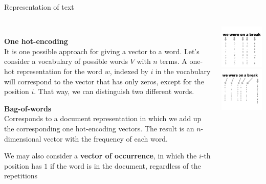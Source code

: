 \documentclass[9pt]{beamer}
\begin{document}
\begin{frame}{Representation of text}
\begin{columns}[onlytextwidth]
    \begin{column}{0.50\textwidth}
    \vspace{0.3cm}\\
     {\textbf{One hot-encoding} \\ It is one possible approach for giving a vector to a word. Let's consider a vocabulary of possible words $V$ with $n$ terms. A one-hot representation for the word $w$, indexed by $i$ in the vocabulary will correspond to the vector that has only zeros, except for the position $i$. That way, we can distinguish two different words.}
     {\textbf{Bag-of-words} \\ Corresponds to a document representation in which we add up the corresponding one hot-encoding vectors. The result is an $n$-dimensional vector with the frequency of each word.
    
    We may also consider a \textbf{vector of occurrence}, in which the $i$-th position has $1$ if the word is in the document, regardless of the repetitions}
    \end{column}
    \begin{column}{0.50\textwidth}
        \centering
         {
            \includegraphics[width = 5cm]{img/one_hot_encoding.png}}
         {
            \includegraphics[width = 5cm]{img/BOW.png}}
    \end{column}
\end{columns}
\end{frame}
\end{document}

